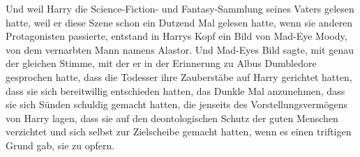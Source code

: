 Und weil Harry die Science-Fiction- und Fantasy-Sammlung seines Vaters gelesen hatte, weil er diese Szene schon ein Dutzend Mal gelesen hatte, wenn sie anderen Protagonisten passierte, entstand in Harrys Kopf ein Bild von Mad-Eye Moody, von dem vernarbten Mann namens Alastor.
Und Mad-Eyes Bild sagte, mit genau der gleichen Stimme, mit der er in der Erinnerung zu Albus Dumbledore gesprochen hatte, dass die Todesser ihre Zauberstäbe auf Harry gerichtet hatten, dass sie sich bereitwillig entschieden hatten, das Dunkle Mal anzunehmen, dass sie sich Sünden schuldig gemacht hatten, die jenseits des Vorstellungsvermögens von Harry lagen, dass sie auf den deontologischen Schutz der guten Menschen verzichtet und sich selbst zur Zielscheibe gemacht hatten, wenn es einen triftigen Grund gab, sie zu opfern.
